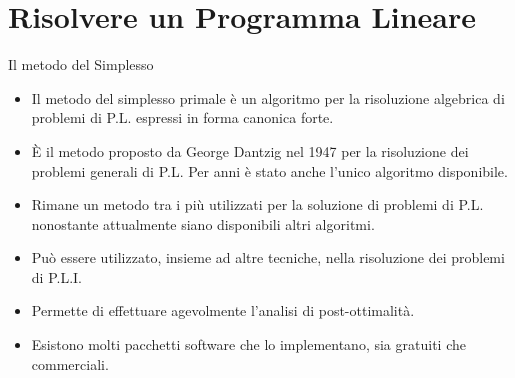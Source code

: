 \documentclass{beamer}
\begin{document}
\generatitolo

\section{Risolvere un Programma Lineare}

\begin{frame}[allowframebreaks]{Il metodo del Simplesso}

\begin{itemize}
\item Il metodo del simplesso primale \`e un algoritmo per la risoluzione algebrica di problemi di P.L. espressi in forma canonica forte.

\item \`E il metodo proposto da George Dantzig nel 1947
per la risoluzione dei problemi generali di P.L.
Per anni \`e stato anche l'unico algoritmo disponibile.

\item Rimane un metodo tra i pi\`u utilizzati per la soluzione di problemi di P.L. nonostante attualmente siano disponibili altri algoritmi.

\item Pu\`o essere utilizzato, insieme ad altre tecniche, nella risoluzione dei problemi di P.L.I.

\item Permette di effettuare agevolmente l'analisi di post-ottimalit\`a.

\item  Esistono molti pacchetti software che lo implementano, sia gratuiti che commerciali.
\end{itemize}
\end{frame}
\end{document}
